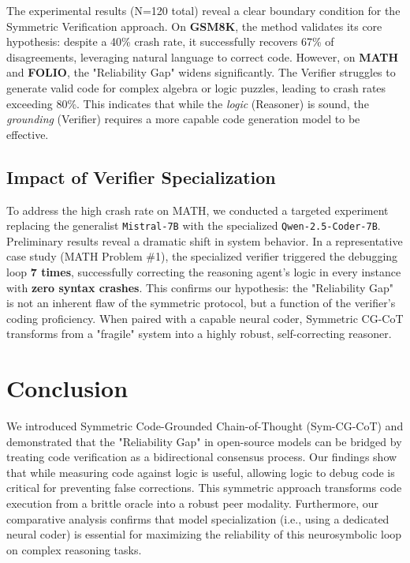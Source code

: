 \documentclass[11pt]{article}
\begin{document}
\begin{itemize}
The experimental results (N=120 total) reveal a clear boundary condition for the Symmetric Verification approach.
On \textbf{GSM8K}, the method validates its core hypothesis: despite a 40\% crash rate, it successfully recovers 67\% of disagreements, leveraging natural language to correct code.
However, on \textbf{MATH} and \textbf{FOLIO}, the "Reliability Gap" widens significantly. The Verifier struggles to generate valid code for complex algebra or logic puzzles, leading to crash rates exceeding 80\%. This indicates that while the \emph{logic} (Reasoner) is sound, the \emph{grounding} (Verifier) requires a more capable code generation model to be effective.

\subsection{Impact of Verifier Specialization}
To address the high crash rate on MATH, we conducted a targeted experiment replacing the generalist \texttt{Mistral-7B} with the specialized \texttt{Qwen-2.5-Coder-7B}. 
Preliminary results reveal a dramatic shift in system behavior. In a representative case study (MATH Problem \#1), the specialized verifier triggered the debugging loop \textbf{7 times}, successfully correcting the reasoning agent's logic in every instance with \textbf{zero syntax crashes}.
This confirms our hypothesis: the "Reliability Gap" is not an inherent flaw of the symmetric protocol, but a function of the verifier's coding proficiency. When paired with a capable neural coder, Symmetric CG-CoT transforms from a "fragile" system into a highly robust, self-correcting reasoner.

\section{Conclusion}
\label{sec:conclusion}

We introduced Symmetric Code-Grounded Chain-of-Thought (Sym-CG-CoT) and demonstrated that the "Reliability Gap" in open-source models can be bridged by treating code verification as a bidirectional consensus process. 
Our findings show that while measuring code against logic is useful, allowing logic to debug code is critical for preventing false corrections. This symmetric approach transforms code execution from a brittle oracle into a robust peer modality. Furthermore, our comparative analysis confirms that model specialization (i.e., using a dedicated neural coder) is essential for maximizing the reliability of this neurosymbolic loop on complex reasoning tasks.


\end{itemize}
\end{document}
